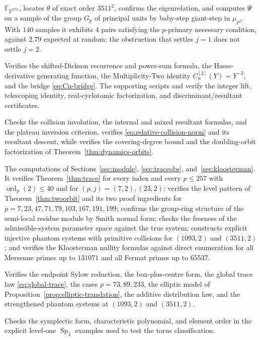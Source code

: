 \documentclass[a4paper]{article}
\newcommand{\F}{\mathbb{F}}
\newcommand{\ord}[2][]{\operatorname{ord}_{#1}\!\left(#2\right)}
\newcommand{\Sp}{\operatorname{Sp}}
\begin{document}
\begin{description}
	      $\F_{2^{1755}}$, locates $\theta$ of exact order $3511^{2}$,
	      confirms the eigenrelation, and computes $\Psi$ on a sample of
	      the group $G_p$ of principal units by baby-step giant-step in
	      $\mu_{p^{2}}$.
	      With $140$ samples it exhibits $4$ pairs satisfying the
	      $p$-primary necessary condition, against $2.79$ expected at
	      random: the obstruction that settles $j=1$ does not settle
	      $j=2$.
	\item[\path{code/cn_experiments/verify_all.py}]
	      Verifies the shifted-Dickson recurrence and power-sum formula,
	      the Hasse-derivative generating function, the
	      Multiplicity-Two identity $C_n^{[2]}(Y)=Y^{-2}$, and the bridge
	      \eqref{eq:Cn-bridge}.  The supporting scripts
	       and
	      verify the integer lift, telescoping identity, real-cyclotomic
	      factorization, and discriminant/resultant certificates.
	\item[\path{code/cn_experiments/collision_parity.py}]
	      Checks the collision involution, the internal and mixed
	      resultant formulas, and the plateau inversion criterion.
	       verifies
	      \eqref{eq:relative-collision-norm} and its resultant descent,
	      while  verifies the covering-degree
	      bound and the doubling-orbit factorization of
	      Theorem~\ref{thm:dynamics-orbits}.
	\item[\path{code/ai_prototypes/circular_module.py}]
	      The computations of Sections~\ref{sec:module},
	      \ref{sec:traceobs}, and~\ref{sec:kloosterman}.
	      It verifies Theorem~\ref{thm:trace} for every index and every
	      $p\leq257$ with $\ord[p]{2}\leq40$ and for
	      $(p,j)=(7,2),(23,2)$; verifies the level pattern of
	      Theorem~\ref{thm:twoorbit} and its two proof ingredients for
	      $p=7,23,47,71,79,103,167,191,199$; confirms the group-ring
	      structure of the semi-local residue module by Smith normal form;
	      checks the freeness of the admissible-system parameter space
	      against the true system; constructs explicit injective phantom
	      systems with primitive collisions for $(1093,2)$ and
	      $(3511,2)$; and verifies the Kloosterman nullity formulas
	      against direct enumeration for all Mersenne primes up to
	      $131071$ and all Fermat primes up to $65537$.
	\item[\path{code/ai_prototypes/plateau_endpoint.py}]
	      Verifies the endpoint Sylow reduction, the box-plus-centre form,
	      the global trace law \eqref{eq:global-trace}, the cases
	      $p=73,89,233$, the elliptic model of
	      Proposition~\ref{prop:elliptic-translation}, the additive
	      distribution law, and the strengthened phantom systems at
	      $(1093,2)$ and $(3511,2)$.
	\item[\path{code/ai_prototypes/sp4_explicit.py}]
	      Checks the symplectic form, characteristic polynomial, and
	      element order in the explicit level-one $\Sp_4$ examples used to
	      test the torus classification.
\end{description}
\end{document}
